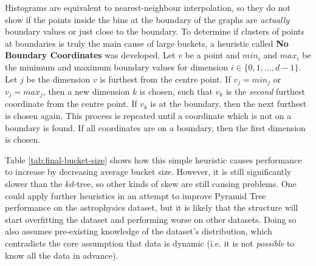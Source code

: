 \begin{table}
	\centering
	\caption{Pyramid Tree Bucket Size Statistics with Different Dimensions of Astrophysics Dataset}
	\label{tab:final-bucket-size}
\end{table}

Histograms are equivalent to nearest-neighbour interpolation, so they do not show if the points inside the bins at the boundary of the graphs are \textit{actually} boundary values or just close to the boundary. To determine if clusters of points at boundaries is truly the main cause of large buckets, a heuristic called \textbf{No Boundary Coordinates} was developed. Let $v$ be a point and $min_i$ and $max_i$ be the minimum and maximum boundary values for dimension $i \in \lbrace 0, 1, ..., d - 1 \rbrace$. Let $j$ be the dimension $v$ is furthest from the centre point. If $v_j = min_j$ or $v_j = max_j$, then a new dimension $k$ is chosen, such that $v_k$ is the \textit{second} furthest coordinate from the centre point. If $v_k$ is at the boundary, then the next furthest is chosen again. This process is repeated until a coordinate which is not on a boundary is found. If all coordinates are on a boundary, then the first dimension is chosen.

Table \ref{tab:final-bucket-size} shows how this simple heuristic causes performance to increase by decreasing average bucket size. However, it is still significantly slower than the $kd$-tree, so other kinds of skew are still causing problems. One could apply further heuristics in an attempt to improve Pyramid Tree performance on the astrophysics dataset, but it is likely that the structure will start overfitting the dataset and performing worse on other datasets. Doing so also assumes pre-existing knowledge of the dataset's distribution,  which contradicts the core assumption that data is dynamic (i.e. it is not \textit{possible} to know all the data in advance).

